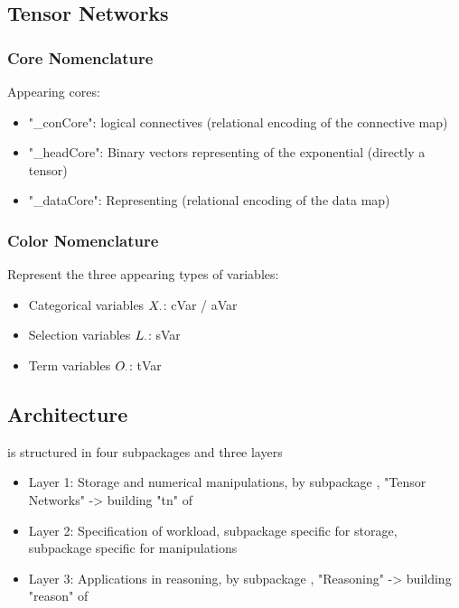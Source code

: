 \subsection{Tensor Networks}

\subsubsection{Core Nomenclature}

Appearing cores:
\begin{itemize}
	\item "\_conCore": logical connectives (relational encoding of the connective map)
	\item "\_headCore": Binary vectors representing of the exponential (directly a tensor)
	\item "\_dataCore": Representing (relational encoding of the data map)
\end{itemize}

\subsubsection{Color Nomenclature}

Represent the three appearing types of variables:
\begin{itemize}
	\item Categorical variables $X_{\cdot}$: cVar / aVar
	\item Selection variables $L_{\cdot}$: sVar %
	\item Term variables $O_{\cdot}$: tVar %
\end{itemize}





\subsection{Architecture}

\tnreason is structured in four subpackages and three layers
\begin{itemize}
	\item Layer 1: Storage and numerical manipulations, by subpackage \spengine, "Tensor Networks" -> building "tn" of \tnreason
	\item Layer 2: Specification of workload, subpackage \spencoding specific for storage, subpackage \spalgorithms specific for manipulations
	\item Layer 3: Applications in reasoning, by subpackage \spknowledge, "Reasoning" -> building "reason" of \tnreason
\end{itemize}

